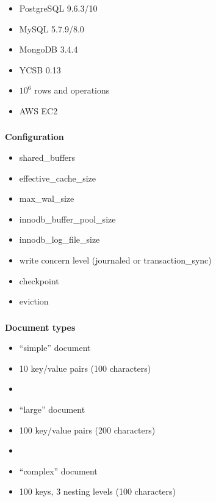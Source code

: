\documentclass[usenames,dvipsnames, 18pt, compress, aspectratio=169]{beamer}
\begin{document}
\begin{frame}
    \frametitle{}
    \begin{center}
        \begin{itemize}[label={}]
            \item PostgreSQL 9.6.3/10
            \item MySQL 5.7.9/8.0
            \item MongoDB 3.4.4
            \item YCSB 0.13
            \item $10^6$ rows and operations
            \item AWS EC2
        \end{itemize}
    \end{center}
\end{frame}

\begin{frame}
    \frametitle{}
    \begin{center}
        \textbf{Configuration}
        \begin{itemize}[label={}]
            \item shared\_buffers
            \item effective\_cache\_size
            \item max\_wal\_size
            \item innodb\_buffer\_pool\_size
            \item innodb\_log\_file\_size
            \item write concern level (journaled or transaction\_sync)
            \item checkpoint
            \item eviction
        \end{itemize}
    \end{center}
\end{frame}

\begin{frame}
    \frametitle{}
    \begin{center}
        \textbf{Document types}
        \begin{itemize}[label={}]
            \item “simple” document
            \item 10 key/value pairs (100 characters)
            \item
            \item “large” document
            \item 100 key/value pairs (200 characters)
            \item
            \item “complex” document
            \item 100 keys, 3 nesting levels (100 characters)
        \end{itemize}
    \end{center}
\end{frame}
\end{document}
